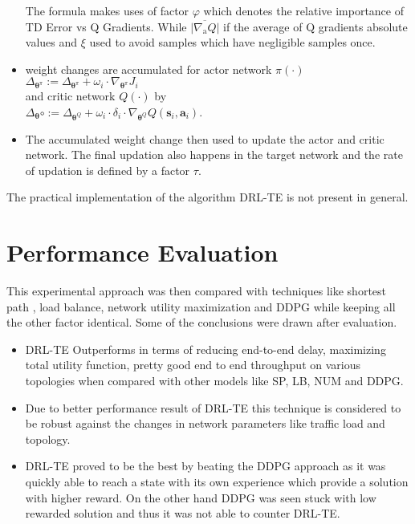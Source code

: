 \begin{itemize}
The formula makes uses of factor $\varphi$ which denotes the relative importance of TD Error vs Q Gradients. While $\overline{\left|\nabla_{\mathrm{a}} Q\right|}$ if the average of Q gradients absolute values and $\xi$ used to avoid samples which have negligible samples once.
\item weight changes are accumulated for actor network $\pi(\cdot)$ 
$\Delta_{\boldsymbol{\theta}^{\pi}}:=\Delta_{\boldsymbol{\theta}^{\pi}}+\omega_{i} \cdot \nabla_{\boldsymbol{\theta}^{\pi}} J_{i}$ \\
and critic network $Q(\cdot)$ by  \\
$\Delta_{\boldsymbol{\theta}} \circ:=\Delta_{\boldsymbol{\theta}^{Q}}+\omega_{i} \cdot \delta_{i} \cdot \nabla_{\boldsymbol{\theta}^{Q}} Q\left(\mathbf{s}_{i}, \mathbf{a}_{i}\right)$.
\item The accumulated weight change then used to update the actor and critic network. The final updation also happens in the target network and the rate of updation is defined by a factor $\tau$.
\end{itemize}
The practical implementation of the algorithm DRL-TE is not present in general.

\section{ Performance Evaluation}
\label{sec:pet-peeves}
This experimental approach was then compared with techniques like shortest path , load balance, network utility maximization and DDPG
while keeping all the other factor identical. Some of the conclusions were drawn after evaluation.
\begin{itemize}
\item DRL-TE \cite{Exp:_DRLapproach} Outperforms in terms of reducing end-to-end delay, maximizing total utility function, pretty good end to end throughput on various topologies when compared with other models like SP, LB, NUM and DDPG. 
\item Due to better performance result of DRL-TE \cite{Exp:_DRLapproach} this technique is considered to be robust against the changes in network parameters like traffic load and topology.
\item DRL-TE \cite{Exp:_DRLapproach} proved to be the best by beating the DDPG approach as it was quickly able to reach a state with its own experience which provide a solution with higher reward. On the other hand DDPG was seen stuck with low rewarded solution and thus it was not able to counter DRL-TE. 
\end{itemize}

